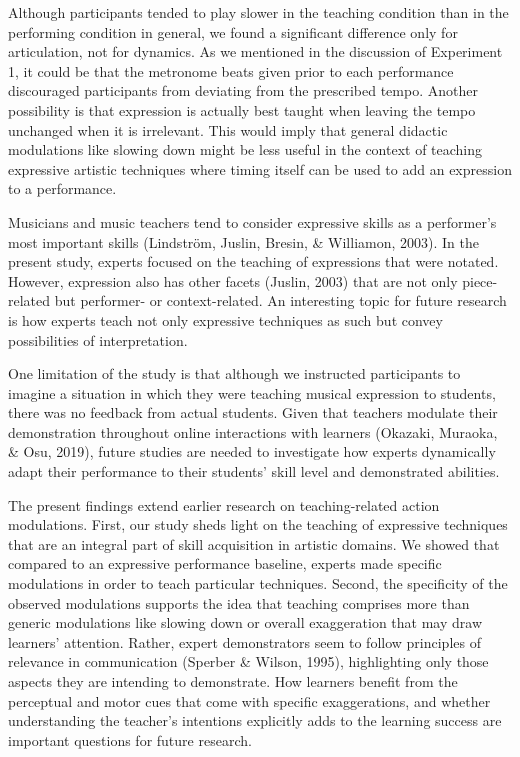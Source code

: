 \documentclass[
  english,
  man,floatsintext]{apa6}
\begin{document}
Although participants tended to play slower in the teaching condition than in the performing condition in general, we found a significant difference only for articulation, not for dynamics. As we mentioned in the discussion of Experiment 1, it could be that the metronome beats given prior to each performance discouraged participants from deviating from the prescribed tempo. Another possibility is that expression is actually best taught when leaving the tempo unchanged when it is irrelevant. This would imply that general didactic modulations like slowing down might be less useful in the context of teaching expressive artistic techniques where timing itself can be used to add an expression to a performance.

Musicians and music teachers tend to consider expressive skills as a performer's most important skills (Lindström, Juslin, Bresin, \& Williamon, 2003). In the present study, experts focused on the teaching of expressions that were notated. However, expression also has other facets (Juslin, 2003) that are not only piece-related but performer- or context-related. An interesting topic for future research is how experts teach not only expressive techniques as such but convey possibilities of interpretation.

One limitation of the study is that although we instructed participants to imagine a situation in which they were teaching musical expression to students, there was no feedback from actual students. Given that teachers modulate their demonstration throughout online interactions with learners (Okazaki, Muraoka, \& Osu, 2019), future studies are needed to investigate how experts dynamically adapt their performance to their students' skill level and demonstrated abilities.

The present findings extend earlier research on teaching-related action modulations. First, our study sheds light on the teaching of expressive techniques that are an integral part of skill acquisition in artistic domains. We showed that compared to an expressive performance baseline, experts made specific modulations in order to teach particular techniques. Second, the specificity of the observed modulations supports the idea that teaching comprises more than generic modulations like slowing down or overall exaggeration that may draw learners' attention. Rather, expert demonstrators seem to follow principles of relevance in communication (Sperber \& Wilson, 1995), highlighting only those aspects they are intending to demonstrate. How learners benefit from the perceptual and motor cues that come with specific exaggerations, and whether understanding the teacher's intentions explicitly adds to the learning success are important questions for future research.
\end{document}
